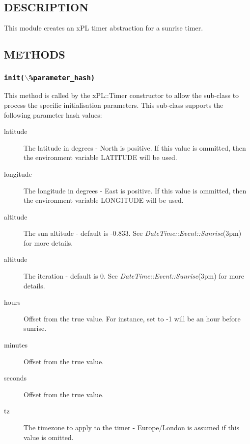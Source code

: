 \documentclass[12pt,a4paper]{article}
\begin{document}
\subsection*{DESCRIPTION\label{xPL::Timer::sunrise_DESCRIPTION}}


This module creates an xPL timer abstraction for a sunrise timer.

\subsection*{METHODS\label{xPL::Timer::sunrise_METHODS}}
\subsubsection*{\texttt{init($\backslash$\%parameter\_hash)}\label{xPL::Timer::sunrise_init_backslash_parameter_hash_}}


This method is called by the xPL::Timer constructor to allow the
sub-class to process the specific initialisation parameters.  This
sub-class supports the following parameter hash values:

\begin{description}

\item[{latitude}] \mbox{}

The latitude in degrees - North is positive.  If this value is
ommitted, then the environment variable LATITUDE will be used.


\item[{longitude}] \mbox{}

The longitude in degrees - East is positive.  If this value is
ommitted, then the environment variable LONGITUDE will be used.


\item[{altitude}] \mbox{}

The sun altitude - default is -0.833.  See \emph{DateTime::Event::Sunrise}(3pm)
for more details.


\item[{altitude}] \mbox{}

The iteration - default is 0.  See \emph{DateTime::Event::Sunrise}(3pm)
for more details.


\item[{hours}] \mbox{}

Offset from the true value.  For instance, set to -1 will be an hour
before sunrise.


\item[{minutes}] \mbox{}

Offset from the true value.


\item[{seconds}] \mbox{}

Offset from the true value.


\item[{tz}] \mbox{}

The timezone to apply to the timer - Europe/London is assumed if this
value is omitted.

\end{description}
\end{document}
